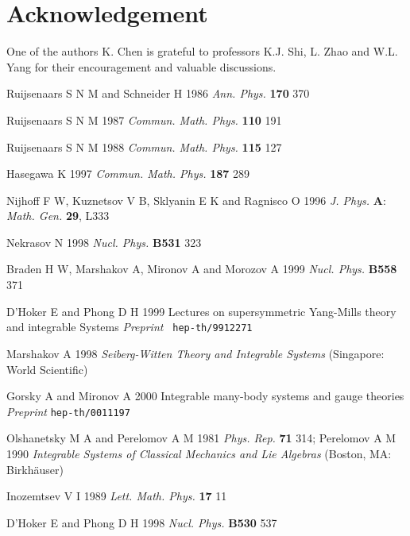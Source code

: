 \documentclass[a4paper,12pt]{article}
\begin{document}
\section*{Acknowledgement}

One of the authors K. Chen is grateful to professors K.J. Shi, L. Zhao and
W.L. Yang for their encouragement and valuable discussions.

\vspace{1pt}

\vspace{1pt}

\begin{thebibliography}{99}
  Ruijsenaars S N M and Schneider H 1986 \textit{Ann. Phys.}
\textbf{170} 370

  Ruijsenaars S N M 1987 \textit{Commun. Math. Phys.} \textbf{%
110 } 191

  Ruijsenaars S N M 1988 \textit{Commun. Math. Phys.} \textbf{%
115 } 127

  Hasegawa K 1997 \textit{Commun. Math. Phys.} \textbf{187} 289

  Nijhoff F W, Kuznetsov V B, Sklyanin E K and Ragnisco O 1996
\textit{J. Phys.} \textbf{A}: \textit{Math. Gen.} \textbf{29}, L333

  Nekrasov N 1998 \textit{Nucl. Phys.} \textbf{B531} 323

  Braden H W, Marshakov A, Mironov A and Morozov A 1999
\textit{Nucl. Phys. }\textbf{B558} 371

  D'Hoker E and Phong D H 1999 Lectures on supersymmetric
Yang-Mills theory and integrable Systems \textit{Preprint }\texttt{\
hep-th/9912271}

  Marshakov A 1998 \textit{Seiberg-Witten Theory and
Integrable Systems} (Singapore: World Scientific)

  Gorsky A and Mironov A 2000 Integrable many-body systems and
gauge theories \textit{Preprint} \texttt{hep-th/0011197}

  Olshanetsky M A and Perelomov A M 1981 \textit{Phys. Rep.}
\textbf{71} 314; Perelomov A M 1990 \textit{Integrable Systems of Classical
Mechanics and Lie Algebras} (Boston, MA: Birkh\"{a}user)

  Inozemtsev V I 1989 \textit{Lett. Math. Phys.} \textbf{17} 11

  D'Hoker E and Phong D H 1998 \textit{Nucl. Phys.} \textbf{%
B530 } 537


\end{thebibliography}
\end{document}
